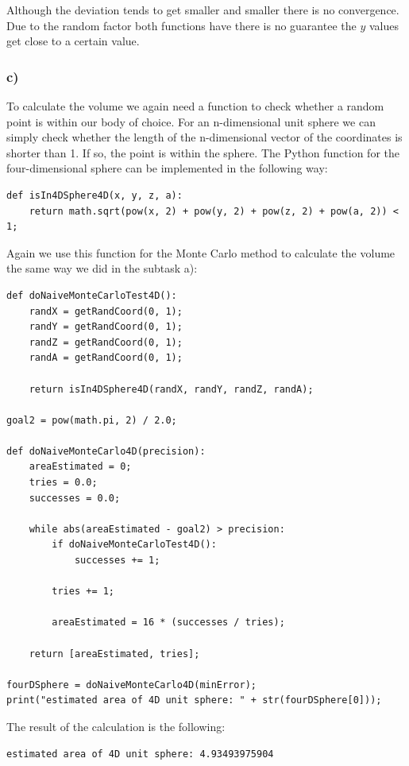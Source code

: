 Although the deviation tends to get smaller and smaller there is no convergence. Due to the random factor both functions have there is no guarantee the $y$ values get close to a certain value.


\subsubsection{c)}

To calculate the volume we again need a function to check whether a random point is within our body of choice. For an n-dimensional unit sphere we can simply check whether the length of the n-dimensional vector of the coordinates is shorter than 1. If so, the point is within the sphere. The Python function for the four-dimensional sphere can be implemented in the following way:

\begin{lstlisting}[caption=Function for the 4D unit sphere volume]
def isIn4DSphere4D(x, y, z, a):
	return math.sqrt(pow(x, 2) + pow(y, 2) + pow(z, 2) + pow(a, 2)) < 1;
\end{lstlisting}

Again we use this function for the Monte Carlo method to calculate the volume the same way we did in the subtask a):

\begin{lstlisting}[caption=4D unit sphere volume calculation]
def doNaiveMonteCarloTest4D():
	randX = getRandCoord(0, 1);
	randY = getRandCoord(0, 1);
	randZ = getRandCoord(0, 1);
	randA = getRandCoord(0, 1);
	
	return isIn4DSphere4D(randX, randY, randZ, randA);

goal2 = pow(math.pi, 2) / 2.0;

def doNaiveMonteCarlo4D(precision):
	areaEstimated = 0;
	tries = 0.0;
	successes = 0.0;

	while abs(areaEstimated - goal2) > precision:
		if doNaiveMonteCarloTest4D():
			successes += 1;
		
		tries += 1;
		
		areaEstimated = 16 * (successes / tries);
	
	return [areaEstimated, tries];

fourDSphere = doNaiveMonteCarlo4D(minError);
print("estimated area of 4D unit sphere: " + str(fourDSphere[0]));
\end{lstlisting}

The result of the calculation is the following:

\begin{lstlisting}[caption=Result of the 4D unit sphere volume calculation, keywordstyle=\color{black}]
estimated area of 4D unit sphere: 4.93493975904
\end{lstlisting}

